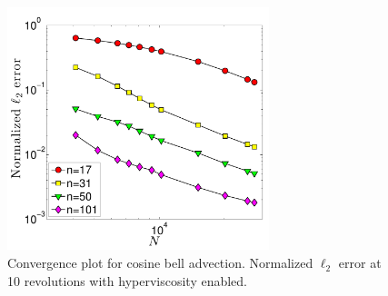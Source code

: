 \documentclass{report}
\begin{document}
\begin{figure}[htbp]
\begin{center}
\includegraphics[width=3in]{../figures/paper1/cosine_bell/convergence_plot_hv-eps-converted-to.pdf}
\caption{Convergence plot for cosine bell advection. Normalized $\ell_2$ error at 10 revolutions with hyperviscosity enabled. }
\label{fig:conv_cosine_bell}
\end{center}
\end{figure}





%




\ifstandalone


\end{document}
